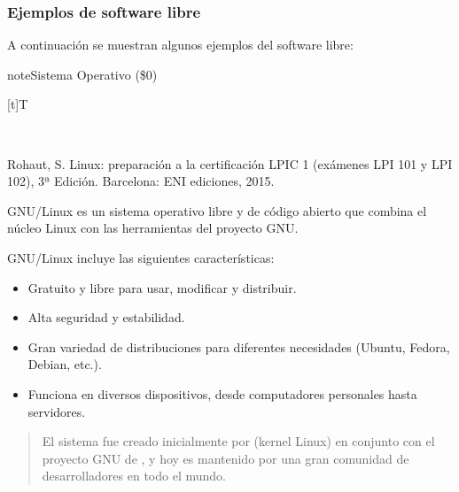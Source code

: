 \documentclass[letterpaper,10pt,spanish]{sphinxmanual}
\let\sphinxpxdimen\pdfpxdimen\else\newdimen\sphinxpxdimen
\begin{document}
\subsubsection{Ejemplos de software libre}
\label{\detokenize{1_guias/10ofimatica/G1012:ejemplos-de-software-libre}}
\sphinxAtStartPar
A continuación se muestran algunos ejemplos del software libre:

\begin{sphinxadmonition}{note}{Sistema Operativo  (\$0)}


\begin{savenotes}\sphinxattablestart
\sphinxthistablewithglobalstyle
\centering
\begin{tabulary}{\linewidth}[t]{T}
\sphinxtoprule
\sphinxtableatstartofbodyhook

\begin{sphinxfigure-in-table}
\centering
\capstart
\noindent\sphinxincludegraphics[width=300\sphinxpxdimen]{{image016}.png}
\label{\detokenize{1_guias/10ofimatica/G1012:id41}}\end{sphinxfigure-in-table}\relax
\\
\sphinxbottomrule
\end{tabulary}
\sphinxtableafterendhook\par
\sphinxattableend\end{savenotes}

\sphinxAtStartPar
%
\begin{footnote}[3]\sphinxAtStartFootnote
Rohaut, S. Linux: preparación a la certificación LPIC 1 (exámenes LPI 101 y LPI 102), 3ª Edición. Barcelona: ENI ediciones, 2015.
%
\end{footnote} GNU/Linux es un sistema operativo libre y de código abierto que combina el núcleo Linux con las herramientas del proyecto GNU.

\sphinxAtStartPar
GNU/Linux incluye las siguientes características:
\begin{itemize}
\item {} 
\sphinxAtStartPar
Gratuito y libre para usar, modificar y distribuir.

\item {} 
\sphinxAtStartPar
Alta seguridad y estabilidad.

\item {} 
\sphinxAtStartPar
Gran variedad de distribuciones para diferentes necesidades (Ubuntu, Fedora, Debian, etc.).

\item {} 
\sphinxAtStartPar
Funciona en diversos dispositivos, desde computadores personales hasta servidores.

\end{itemize}
\begin{quote}

\sphinxAtStartPar
El sistema fue creado inicialmente por  (kernel Linux) en conjunto con el proyecto GNU de , y hoy es mantenido por una gran comunidad de desarrolladores en todo el mundo.
\end{quote}
\end{sphinxadmonition}
\end{document}

